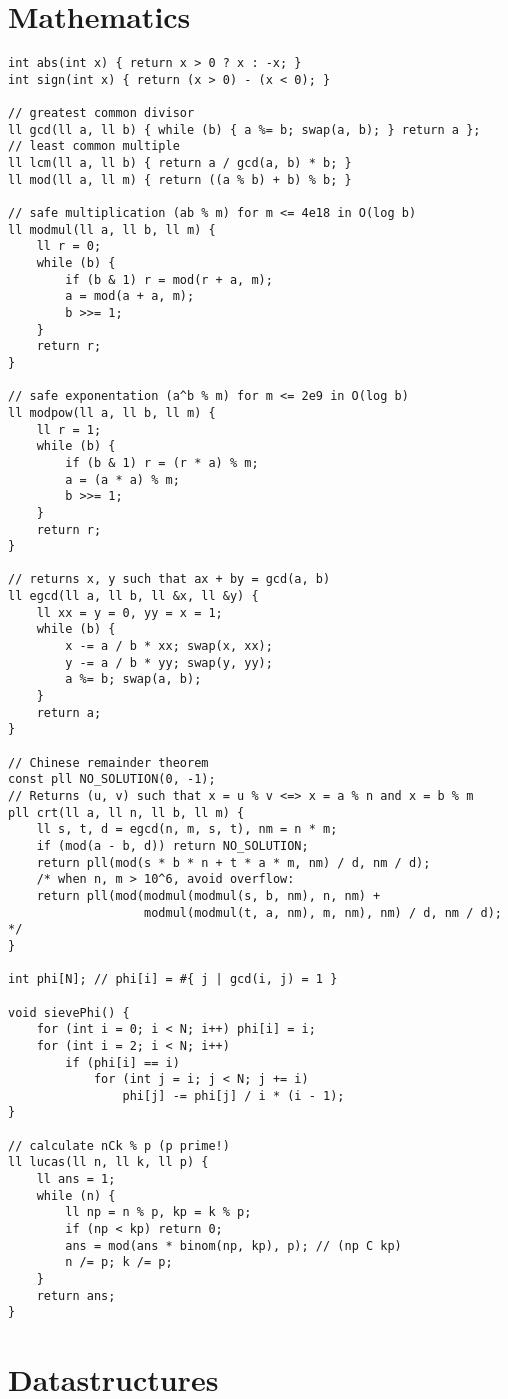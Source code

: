 \documentclass{article}
\begin{document}
\section{Mathematics}

\begin{lstlisting}
int abs(int x) { return x > 0 ? x : -x; }
int sign(int x) { return (x > 0) - (x < 0); }

// greatest common divisor
ll gcd(ll a, ll b) { while (b) { a %= b; swap(a, b); } return a };
// least common multiple
ll lcm(ll a, ll b) { return a / gcd(a, b) * b; }
ll mod(ll a, ll m) { return ((a % b) + b) % b; }

// safe multiplication (ab % m) for m <= 4e18 in O(log b)
ll modmul(ll a, ll b, ll m) {
	ll r = 0;
	while (b) {
		if (b & 1) r = mod(r + a, m);
		a = mod(a + a, m);
		b >>= 1;
	}
	return r;
}

// safe exponentation (a^b % m) for m <= 2e9 in O(log b)
ll modpow(ll a, ll b, ll m) {
	ll r = 1;
	while (b) {
		if (b & 1) r = (r * a) % m;
		a = (a * a) % m;
		b >>= 1;
	}
	return r;
}

// returns x, y such that ax + by = gcd(a, b)
ll egcd(ll a, ll b, ll &x, ll &y) {
	ll xx = y = 0, yy = x = 1;
	while (b) {
		x -= a / b * xx; swap(x, xx);
		y -= a / b * yy; swap(y, yy);
		a %= b; swap(a, b);
	}
	return a;
}

// Chinese remainder theorem
const pll NO_SOLUTION(0, -1);
// Returns (u, v) such that x = u % v <=> x = a % n and x = b % m
pll crt(ll a, ll n, ll b, ll m) {
	ll s, t, d = egcd(n, m, s, t), nm = n * m;
	if (mod(a - b, d)) return NO_SOLUTION;
	return pll(mod(s * b * n + t * a * m, nm) / d, nm / d);
	/* when n, m > 10^6, avoid overflow:
	return pll(mod(modmul(modmul(s, b, nm), n, nm) + 
				   modmul(modmul(t, a, nm), m, nm), nm) / d, nm / d); */
}

int phi[N]; // phi[i] = #{ j | gcd(i, j) = 1 }

void sievePhi() {
	for (int i = 0; i < N; i++) phi[i] = i;
	for (int i = 2; i < N; i++)
		if (phi[i] == i)
			for (int j = i; j < N; j += i)
				phi[j] -= phi[j] / i * (i - 1);
}

// calculate nCk % p (p prime!)
ll lucas(ll n, ll k, ll p) {
	ll ans = 1;
	while (n) {
		ll np = n % p, kp = k % p;
		if (np < kp) return 0;
		ans = mod(ans * binom(np, kp), p); // (np C kp)
		n /= p; k /= p;
	}
	return ans;
}
\end{lstlisting}

\section{Datastructures}
\end{document}
